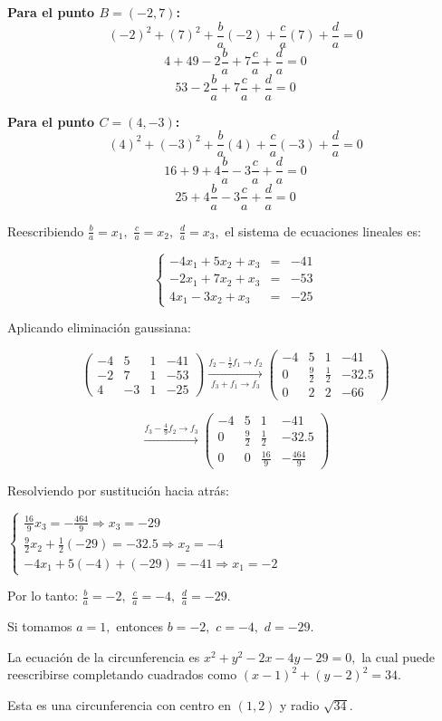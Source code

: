 \begin{prob}
\begin{myproof}
\textbf{Para el punto $B = (-2, 7)$:}
$$(-2)^2 + (7)^2 + \frac{b}{a}(-2) + \frac{c}{a}(7) + \frac{d}{a} = 0$$
$$4 + 49 - 2\frac{b}{a} + 7\frac{c}{a} + \frac{d}{a} = 0$$
$$53 - 2\frac{b}{a} + 7\frac{c}{a} + \frac{d}{a} = 0$$

\textbf{Para el punto $C = (4, -3)$:}
$$(4)^2 + (-3)^2 + \frac{b}{a}(4) + \frac{c}{a}(-3) + \frac{d}{a} = 0$$
$$16 + 9 + 4\frac{b}{a} - 3\frac{c}{a} + \frac{d}{a} = 0$$
$$25 + 4\frac{b}{a} - 3\frac{c}{a} + \frac{d}{a} = 0$$

Reescribiendo $\frac{b}{a}=x_1,$ $\frac{c}{a}=x_2,$ $\frac{d}{a}=x_3,$ el sistema de ecuaciones lineales es:

$$\left\lbrace \begin{array}{rcl}
-4x_1 + 5x_2 + x_3 &=& -41\\
-2x_1 + 7x_2 + x_3 &=& -53\\
4x_1 - 3x_2 + x_3 &=& -25
\end{array} \right.$$

Aplicando eliminación gaussiana:

$$\left( \begin{array}{ccc|c}
-4&5&1&-41\\
-2&7&1&-53\\
4&-3&1&-25
\end{array}\right) \xrightarrow[\text{$f_3 + f_1\to f_3$}]{\text{$f_2 - \frac{1}{2}f_1\to f_2$}} \left( \begin{array}{ccc|c}
-4&5&1&-41\\
0&\frac{9}{2}&\frac{1}{2}&-32.5\\
0&2&2&-66
\end{array}\right)$$

$$\xrightarrow{\text{$f_3 - \frac{4}{9}f_2\to f_3$}} \left( \begin{array}{ccc|c}
-4&5&1&-41\\
0&\frac{9}{2}&\frac{1}{2}&-32.5\\
0&0&\frac{16}{9}&-\frac{464}{9}
\end{array}\right)$$

Resolviendo por sustitución hacia atrás:


$\begin{cases}
\frac{16}{9}x_3 = -\frac{464}{9} \Rightarrow x_3 = -29\\
\frac{9}{2}x_2 + \frac{1}{2}(-29) = -32.5 \Rightarrow x_2 = -4\\
-4x_1 + 5(-4) + (-29) = -41 \Rightarrow x_1 = -2
\end{cases}$

Por lo tanto: $\frac{b}{a} = -2,$ $\frac{c}{a} = -4,$ $\frac{d}{a} = -29.$

Si tomamos $a = 1,$ entonces $b = -2,$ $c = -4,$ $d = -29.$

La ecuación de la circunferencia es $x^2+y^2-2x-4y-29=0,$ la cual puede reescribirse completando cuadrados como $(x - 1)^2 + (y - 2)^2 = 34.$

Esta es una circunferencia con centro en $(1, 2)$ y radio $\sqrt{34}.$

\end{myproof}

\end{prob}


